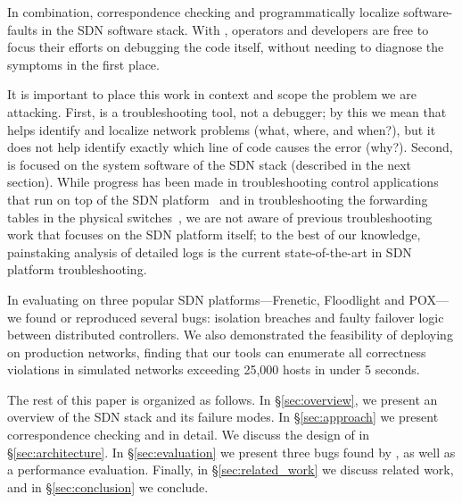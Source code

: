 {In combination, correspondence checking and \simulator{} programmatically
localize software-faults in the SDN software stack.
With \projectname{}, operators and developers are free to focus their efforts
on debugging the code itself, without needing to
diagnose the symptoms in the first place.

It is important to place this work in context and scope the problem we are
attacking. First, \projectname{} is a troubleshooting tool, not a debugger; by
this we mean that \projectname{} helps identify and localize network
problems (what, where, and when?), but it does not help identify exactly which
line of code causes the error (why?). Second, \projectname{} is focused on the
system software of the SDN stack (described in the next section). While progress has been made in troubleshooting control
applications that run on top of the SDN platform~\cite{nice} and in troubleshooting the forwarding tables in the physical switches~\cite{anteater,hsa}, we
are not aware of previous troubleshooting work that focuses on the SDN
platform itself; to the best of our knowledge, painstaking analysis of detailed logs is the current state-of-the-art in SDN platform troubleshooting.

In evaluating \projectname{} on
three popular SDN platforms---Frenetic, Floodlight and POX---we found or reproduced several bugs:
isolation breaches and faulty failover logic between distributed controllers.
We also demonstrated the feasibility of deploying
\projectname{} on production networks,
finding that our tools can enumerate all correctness violations in
simulated networks exceeding 25,000 hosts in under 5 seconds.

The rest of this paper is organized as follows. In \S\ref{sec:overview},
we present an overview of the SDN stack and its failure modes.
In \S\ref{sec:approach} we present correspondence checking and
\simulator{} in detail. We discuss the design of \projectname{} in
\S\ref{sec:architecture}. In \S\ref{sec:evaluation} we present
three bugs found by \projectname{}, as well as a performance evaluation.
Finally, in \S\ref{sec:related_work} we discuss related work,
and in \S\ref{sec:conclusion} we conclude.


\eat{
}}
